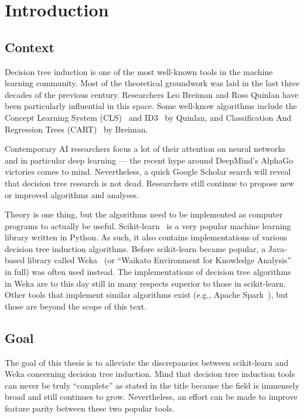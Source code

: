 \chapter{Introduction}\label{cha:intro}

\section{Context}
Decision tree induction is one of the most well-known tools in the machine learning community. Most of the theoretical groundwork was laid in the last three decades of the previous century. Researchers Leo Breiman and Ross Quinlan have been particularly influential in this space. Some well-know algorithms include the Concept Learning System (CLS)~\cite{cls} and ID3~\cite{id3, id3bis, id3ter} by Quinlan, and Classification And Regression Trees (CART)~\cite{cart} by Breiman. 

Contemporary AI researchers focus a lot of their attention on neural networks and in particular deep learning --- the recent hype around DeepMind's AlphaGo~\cite{alphago} victories comes to mind. Nevertheless, a quick Google Scholar search will reveal that decision tree research is not dead. Researchers still continue to propose new or improved algorithms and analyses.

Theory is one thing, but the algorithms need to be implemented as computer programs to actually be useful. Scikit-learn~\cite{scikit-learn} is a very popular machine learning library written in Python. As such, it also contains implementations of various decision tree induction algorithms. Before scikit-learn became popular, a Java-based library called Weka~\cite{eibe2016weka} (or ``Waikato Environment for Knowledge Analysis'' in full) was often used instead. The implementations of decision tree algorithms in Weka are to this day still in many respects superior to those in scikit-learn. Other tools that implement similar algorithms exist (e.g., Apache Spark~\cite{spark}), but those are beyond the scope of this text.

\section{Goal}
The goal of this thesis is to alleviate the discrepancies between scikit-learn and Weka concerning decision tree induction. Mind that decision tree induction tools can never be truly ``complete'' as stated in the title because the field is immensely broad and still continues to grow. Nevertheless, an effort can be made to improve feature parity between these two popular tools.

